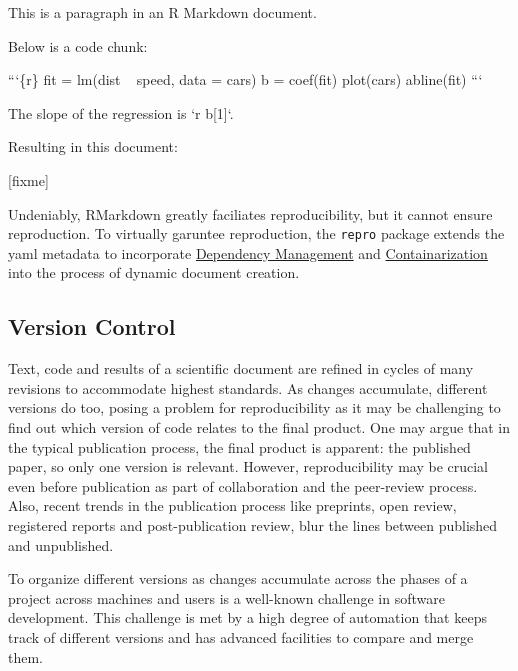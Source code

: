 \documentclass[12pt,a4paper,]{article}
\newenvironment{Shaded}{\begin{snugshade}}{\end{snugshade}}
\newcommand{\BaseNTok}[1]{\textcolor[rgb]{0.00,0.00,0.81}{#1}}
\newcommand{\NormalTok}[1]{#1}
\begin{document}
\begin{Shaded}
\begin{Highlighting}[]
\NormalTok{This is a paragraph in an R Markdown document.}

\NormalTok{Below is a code chunk:}

\NormalTok{```\{r\}}
\NormalTok{fit = lm(dist ~ speed, data = cars)}
\NormalTok{b   = coef(fit)}
\NormalTok{plot(cars)}
\NormalTok{abline(fit)}
\NormalTok{```}

\NormalTok{The slope of the regression is }\BaseNTok{`r b[1]`}\NormalTok{.}
\end{Highlighting}
\end{Shaded}

Resulting in this document:

{[}fixme{]}

Undeniably, RMarkdown greatly faciliates reproducibility, but it cannot ensure reproduction. To virtually garuntee reproduction, the \texttt{repro} package extends the yaml metadata to incorporate \protect\hyperlink{dependency-management}{Dependency Management} and \protect\hyperlink{containarization}{Containarization} into the process of dynamic document creation.

\hypertarget{version-control}{%
\subsection{Version Control}\label{version-control}}

Text, code and results of a scientific document are refined in cycles of many revisions to accommodate highest standards.
As changes accumulate, different versions do too, posing a problem for reproducibility as it may be challenging to find out which version of code relates to the final product.
One may argue that in the typical publication process, the final product is apparent: the published paper, so only one version is relevant.
However, reproducibility may be crucial even before publication as part of collaboration and the peer-review process.
Also, recent trends in the publication process like preprints, open review, registered reports and post-publication review, blur the lines between published and unpublished.

To organize different versions as changes accumulate across the phases of a project across machines and users is a well-known challenge in software development.
This challenge is met by a high degree of automation that keeps track of different versions and has advanced facilities to compare and merge them.
\end{document}
